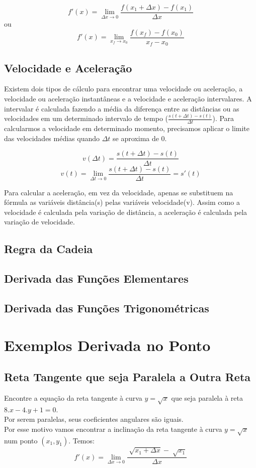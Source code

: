 \documentclass[ ]{article}
\begin{document}
		$$f'(x) = \lim_{\Delta x\to 0} \dfrac{f(x_1+\Delta x)-f(x_1)}{\Delta x}$$
		ou
		$$f'(x) = \lim_{x_f\to x_0}\dfrac{f(x_f)-f(x_0)}{x_f-x_0}$$	
		
	\subsection{Velocidade e Aceleração}
		Existem dois tipos de cálculo para encontrar uma velocidade ou aceleração, a velocidade ou aceleração instantâneas e a velocidade e aceleração intervalares. A intervalar é calculada fazendo a média da diferença entre as distâncias ou as velocidades em um determinado intervalo de tempo ($\frac{s(t+\Delta t)-s(t)}{\Delta t}$). Para calcularmos a velocidade em determinado momento, precisamos aplicar o limite das velocidades médias quando $\Delta t$ se aproxima de 0.
		
		$$v(\Delta t) = \frac{s(t+\Delta t)-s(t)}{\Delta t}$$
		$$v(t) =\lim_{\Delta t\to 0}\frac{s(t+\Delta t)-s(t)}{\Delta t}= s'(t)$$
		
		Para calcular a aceleração, em vez da velocidade, apenas se substituem na fórmula as variáveis distância(s) pelas variáveis velocidade(v). Assim como a velocidade é calculada pela variação de distância, a aceleração é calculada pela variação de velocidade.
		
	\subsection{Regra da Cadeia}
	\subsection{Derivada das Funções Elementares}
		
	\subsection{Derivada das Funções Trigonométricas}
	
\newpage
\section{Exemplos Derivada no Ponto}
	\subsection{Reta Tangente que seja Paralela a Outra Reta}	
		Encontre a equação da reta tangente à curva $y = \sqrt{x}$ que seja paralela à reta $8.x - 4.y + 1 = 0$.\\
		Por serem paralelas, seus coeficientes angulares são iguais.\\
		Por esse motivo vamos encontrar a inclinação da reta tangente à curva $y = \sqrt{x}$ num ponto $(x_1,y_1)$. Temos:
		$$f'(x) = \lim_{\Delta x\to 0}\dfrac{\sqrt[]{x_1 + \Delta x}-\sqrt[ ]{x_1}}{\Delta x}$$
\end{document}
